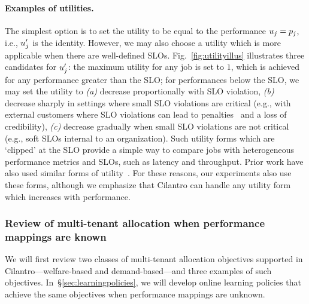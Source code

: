 \paragraph{Examples of utilities.}
The simplest option is to set the utility to be equal to the performance $u_{j} = p_{j}$,
i.e., $u'_{j}$ is the identity. 
However, we may also choose a utility which is more applicable when there are well-defined SLOs.
Fig.~\ref{fig:utilityillus} illustrates three  candidates for $u'_{j}$:
the maximum utility for any job is set to $1$, which is achieved for any performance greater than
the SLO; for performances below the SLO, we may set the utility to
\emph{(a)} decrease proportionally with SLO violation,
\emph{(b)} decrease sharply 
in settings where small SLO violations are critical (e.g., with external customers
where SLO violations can lead to penalties~\cite{awssla2021} and a loss of credibility),
\emph{(c)} decrease gradually
when small SLO violations are not critical (e.g., soft SLOs internal to
an organization).
Such utility forms which are `clipped' at the SLO
provide a simple way to compare jobs with heterogeneous
performance metrics and SLOs, such
as latency and throughput.
Prior work have also used similar forms of utility~\cite{kalim2018henge,ghodsi2012multi,wilkes2009utility}.
For these reasons, our experiments also use these  forms,
although we emphasize that Cilantro can handle any utility form which increases with performance. 



\subsubsection{Review of multi-tenant allocation when performance mappings are known}
\label{sec:oracularpolicies}

We will first review two classes of multi-tenant
allocation objectives supported
in Cilantro---welfare-based and demand-based---and three examples of such objectives.
In~\S\ref{sec:learningpolicies},
we will develop online learning policies that achieve the same objectives
when performance mappings are unknown.


